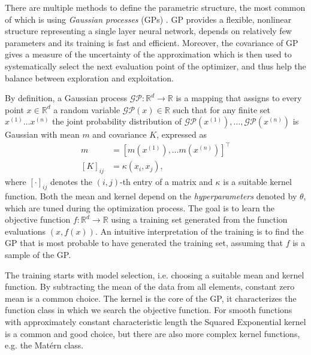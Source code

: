 There are multiple methods to define the parametric structure, the most common of which is using \textit{Gaussian processes} (GPs) \cite{GPMPC2019}. GP provides a flexible, nonlinear structure representing a single layer neural network, depends on relatively few parameters and its training is fast and efficient. Moreover, the covariance of GP gives a measure of the uncertainty of the approximation which is then used to systematically select the next evaluation point of the optimizer, and thus help the balance between exploration and exploitation.

By definition, a Gaussian process $\mathcal{GP}: \mathbb{R}^{d} \rightarrow \mathbb{R}$ is a mapping that assigns to every point $x \in \mathbb{R}^{d}$ a random variable $\mathcal{G} \mathcal{P}(x) \in \mathbb{R}$ such that for any finite set $x^{(1)} \ldots x^{(n)}$ the joint probability distribution of $\mathcal{G} \mathcal{P}\left(x^{(1)}\right), \ldots, \mathcal{G} \mathcal{P}\left(x^{(n)}\right)$ is Gaussian with mean $m$ and covariance $K$, expressed as
\begin{subequations}
\begin{align}
m &=\left[m\left(x^{(1)}\right), \ldots m\left(x^{(n)}\right)\right]^{\top} \\
[K]_{i j} &=\kappa\left(x_{i}, x_{j}\right),
\end{align}
\end{subequations}
where $[\cdot]_{i j}$ denotes the $(i, j)$-th entry of a matrix and $\kappa$ is a suitable kernel function. Both the mean and kernel depend on the \textit{hyperparameters} denoted by $\theta$, which are tuned during the optimization process. The goal is to learn the objective function $f:\mathbb{R}^d \rightarrow \mathbb{R}$ using a training set generated from the function evaluations $(x, f(x))$. An intuitive interpretation of the training is to find the GP that is most probable to have generated the training set, assuming that $f$ is a sample of the GP. 

The training starts with model selection, i.e. choosing a suitable mean and kernel function. By subtracting the mean of the data from all elements, constant zero mean is a common choice. The kernel is the core of the GP, it characterizes the function class in which we search the objective function. For smooth functions with approximately constant characteristic length the Squared Exponential kernel is a common and good choice, but there are also more complex kernel functions, e.g. the Matérn class.

